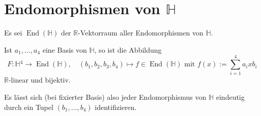\documentclass[aspectratio=169]{beamer}
\newcommand{\Ham}{\ensuremath{\mathbb{H}}{ }}
\newcommand{\R}{\ensuremath{\mathbb{R}}{ }}
\DeclareMathOperator{\End}{End}
\begin{document}
    \section{Endomorphismen von \(\mathbb{H}\)}
    \begin{frame}
        Es sei \(\End(\Ham)\) der \(\R\)-Vektorraum aller Endomorphismen von \(\Ham\).

        \begin{theorem}
            Ist \(a_1, \dots, a_4\) eine Basis von \(\Ham\), so ist die Abbildung
            \[
                F \colon \Ham^4 \to \End(\Ham), \quad \left( b_1, b_2, b_3, b_4 \right) \mapsto f \in \End(\Ham) \text{ mit } f(x) := \sum_{i=1}^4 a_i x b_i
            \] 
            \(\R\)-linear und bijektiv.

            Es lässt sich (bei fixierter Basis) also jeder Endomorphismus von \Ham eindeutig durch ein Tupel \(\left(b_1, \dots, b_4\right)\) identifizieren.
        \end{theorem}
    \end{frame}
\end{document}
